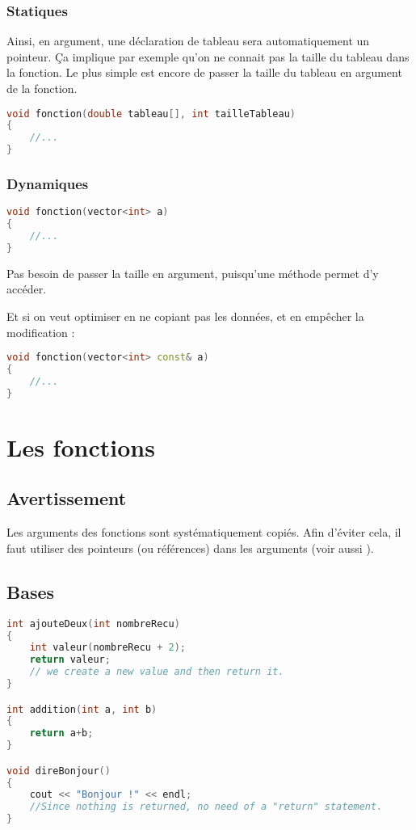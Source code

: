 \documentclass[a4paper,twoside]{article}
\begin{document}
\subsubsection{Statiques}
Ainsi, en argument, une déclaration de tableau sera automatiquement un pointeur. Ça implique par exemple qu'on ne connait pas 
la taille du tableau dans la fonction. Le plus simple est encore de passer la taille du tableau en argument de la fonction. 

\begin{lstlisting}[language=C++]
void fonction(double tableau[], int tailleTableau)
{
    //...
}
\end{lstlisting}

\subsubsection{Dynamiques}
\begin{lstlisting}[language=C++]
void fonction(vector<int> a)
{
    //...
}
\end{lstlisting}
Pas besoin de passer la taille en argument, puisqu'une méthode permet d'y accéder. 

Et si on veut optimiser en ne copiant pas les données, et en empêcher la modification :
\begin{lstlisting}[language=C++]
void fonction(vector<int> const& a)
{
    //...
}
\end{lstlisting}

\section{Les fonctions}
\subsection{Avertissement}
Les arguments des fonctions sont systématiquement copiés. Afin d'éviter cela, il faut utiliser des pointeurs (ou références) 
dans les arguments (voir aussi ).
\subsection{Bases}
\begin{lstlisting}[language=C++]
int ajouteDeux(int nombreRecu)
{
    int valeur(nombreRecu + 2);
    return valeur;
    // we create a new value and then return it.
}

int addition(int a, int b)
{
    return a+b;
}

void direBonjour()
{
    cout << "Bonjour !" << endl;
    //Since nothing is returned, no need of a "return" statement.
}
\end{lstlisting}
\end{document}
